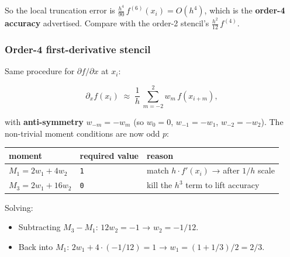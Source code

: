 So the local truncation error is
\(\tfrac{h^4}{90}\,f^{(6)}(x_i) = O(h^4)\), which is the \textbf{order-4
accuracy} advertised. Compare with the order-2 stencil's
\(\tfrac{h^2}{12}\,f^{(4)}\).

\subsubsection{Order-4 first-derivative
stencil}\label{order-4-first-derivative-stencil}

Same procedure for \(\partial f / \partial x\) at \(x_i\):

\[
\partial_x f(x_i) \;\approx\; \frac{1}{h}\,\sum_{m=-2}^{2} w_m\,f(x_{i+m}),
\]

with \textbf{anti-symmetry} \(w_{-m} = -w_m\) (so \(w_0 = 0\),
\(w_{-1} = -w_1\), \(w_{-2} = -w_2\)). The non-trivial moment conditions
are now odd \(p\):

{\def\LTcaptype{none} %
\begin{longtable}[]{@{}
  >{\raggedright\arraybackslash}p{}
  >{\raggedright\arraybackslash}p{}
  >{\raggedright\arraybackslash}p{}@{}}
\toprule\noalign{}
\begin{minipage}[b]{\linewidth}\raggedright
moment
\end{minipage} & \begin{minipage}[b]{\linewidth}\raggedright
required value
\end{minipage} & \begin{minipage}[b]{\linewidth}\raggedright
reason
\end{minipage} \\
\midrule\noalign{}
\endhead
\bottomrule\noalign{}
\endlastfoot
\(M_1 = 2 w_1 + 4 w_2\) & \passthrough{\lstinline!1!} & match
\(h \cdot f'(x_i)\) → after \(1/h\) scale \\
\(M_3 = 2 w_1 + 16 w_2\) & \passthrough{\lstinline!0!} & kill the
\(h^3\) term to lift accuracy \\
\end{longtable}
}

Solving:

\begin{itemize}
\tightlist
\item
  Subtracting \(M_3 - M_1\): \(12 w_2 = -1\) → \(w_2 = -1/12\).
\item
  Back into \(M_1\): \(2 w_1 + 4 \cdot (-1/12) = 1\) →
  \(w_1 = (1 + 1/3)/2 = 2/3\).
\end{itemize}

